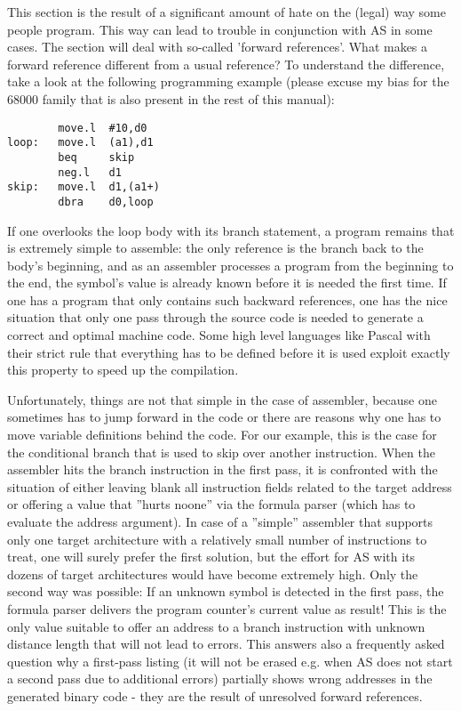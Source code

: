 \documentclass[12pt,twoside]{report}
\begin{document}
This section is the result of a significant amount of hate on the
(legal) way some people program.  This way can lead to trouble in
conjunction with AS in some cases.  The section will deal with
so-called 'forward references'.  What makes a forward reference
different from a usual reference?  To understand the difference, take
a look at the following programming example (please excuse my bias
for the 68000 family that is also present in the rest of this
manual):
\begin{verbatim}
        move.l  #10,d0
loop:   move.l  (a1),d1
        beq     skip
        neg.l   d1
skip:   move.l  d1,(a1+)
        dbra    d0,loop
\end{verbatim}
If one overlooks the loop body with its branch statement, a program
remains that is extremely simple to assemble: the only reference is
the branch back to the body's beginning, and as an assembler
processes a program from the beginning to the end, the symbol's value
is already known before it is needed the first time.  If one has a
program that only contains such backward references, one has the nice
situation that only one pass through the source code is needed to
generate a correct and optimal machine code.  Some high level
languages like Pascal with their strict rule that everything has to
be defined before it is used exploit exactly this property to speed
up the compilation.

Unfortunately, things are not that simple in the case of assembler,
because one sometimes has to jump forward in the code or there are
reasons why one has to move variable definitions behind the code.
For our example, this is the case for the conditional branch that is
used to skip over another instruction.  When the assembler hits the
branch instruction in the first pass, it is confronted with the
situation of either leaving blank all instruction fields related to
the target address or offering a value that ''hurts noone'' via the
formula parser (which has to evaluate the address argument).  In case
of a ''simple'' assembler that supports only one target architecture
with a relatively small number of instructions to treat, one will
surely prefer the first solution, but the effort for AS with its
dozens of target architectures would have become extremely high.
Only the second way was possible: If an unknown symbol is detected in
the first pass, the formula parser delivers the program counter's
current value as result!  This is the only value suitable to offer an
address to a branch instruction with unknown distance length that
will not lead to errors.  This answers also a frequently asked
question why a first-pass listing (it will not be erased e.g. when AS
does not start a second pass due to additional errors) partially
shows wrong addresses in the generated binary code - they are the
result of unresolved forward references.
\end{document}
